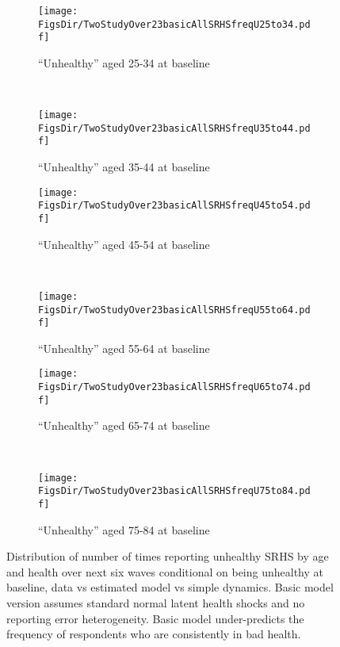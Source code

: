 \documentclass[12pt,pdftex,letterpaper]{article}
\newcommand{\RootDir}{..}
\newcommand{\FigsDir}{\RootDir/Figures}
\begin{document}
\begin{figure}
	\centering
	\begin{subfigure}[b]{0.48\textwidth}
		\texttt{[image: \\FigsDir/TwoStudyOver23basicAllSRHSfreqU25to34.pdf]}
		\caption{``Unhealthy'' aged 25-34 at baseline}\label{fig:SRHSfreqU25to34basic}
	\end{subfigure}
	~
	\begin{subfigure}[b]{0.48\textwidth}
		\texttt{[image: \\FigsDir/TwoStudyOver23basicAllSRHSfreqU35to44.pdf]}
		\caption{``Unhealthy'' aged 35-44 at baseline}\label{fig:SRHSfreqU35to44basic}
	\end{subfigure}
	
	\begin{subfigure}[b]{0.48\textwidth}
		\texttt{[image: \\FigsDir/TwoStudyOver23basicAllSRHSfreqU45to54.pdf]}
		\caption{``Unhealthy'' aged 45-54 at baseline}\label{fig:SRHSfreqU45to54basic}
	\end{subfigure}
	~
	\begin{subfigure}[b]{0.48\textwidth}
		\texttt{[image: \\FigsDir/TwoStudyOver23basicAllSRHSfreqU55to64.pdf]}
		\caption{``Unhealthy'' aged 55-64 at baseline}\label{fig:SRHSfreqU55to64basic}
	\end{subfigure}
	
	
	\begin{subfigure}[b]{0.48\textwidth}
		\texttt{[image: \\FigsDir/TwoStudyOver23basicAllSRHSfreqU65to74.pdf]}
		\caption{``Unhealthy'' aged 65-74 at baseline}\label{fig:SRHSfreqU65to74basic}
	\end{subfigure}
	~
	\begin{subfigure}[b]{0.48\textwidth}
		\texttt{[image: \\FigsDir/TwoStudyOver23basicAllSRHSfreqU75to84.pdf]}
		\caption{``Unhealthy'' aged 75-84 at baseline}\label{fig:SRHSfreqU75to84basic}
	\end{subfigure}
	\caption{Distribution of number of times reporting unhealthy SRHS by age and health over next six waves conditional on being unhealthy at baseline, data vs estimated model vs simple dynamics. Basic model version assumes standard normal latent health shocks and no reporting error heterogeneity. Basic model under-predicts the frequency of respondents who are consistently in bad health.}\label{fig:SRHSfreqUTwoStudybasic}
\end{figure}
\end{document}
